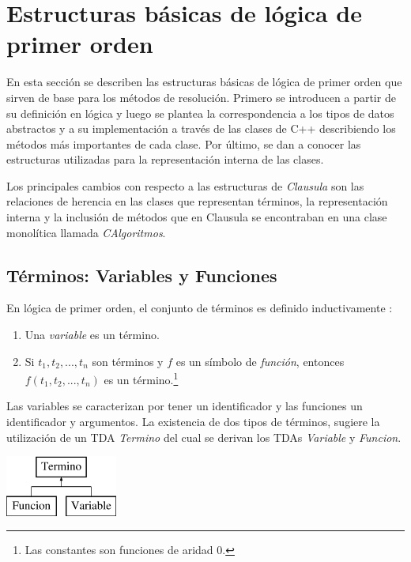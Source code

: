 \documentclass[a4paper,12pt]{article}
\begin{document}
\section{Estructuras básicas de lógica de primer orden}
En esta sección se describen las estructuras básicas de lógica de primer orden que sirven de base para los métodos de resolución.
Primero se introducen a partir de su definición en lógica y luego se plantea la correspondencia a los tipos de datos abstractos
y a su implementación a través de las clases de C++ describiendo los métodos más importantes de cada clase. 
Por último, se dan a conocer las estructuras utilizadas para la representación interna de las clases.

Los principales cambios con respecto a las estructuras de \emph{Clausula} son las relaciones de herencia
en las clases que representan términos, la representación interna y la inclusión de métodos que en Clausula
se encontraban en una clase monolítica llamada \emph{CAlgoritmos}.
\subsection{Términos: Variables y Funciones} %
En lógica de primer orden, el conjunto de términos es definido inductivamente \cite{ApuntesLogica}:
\begin{enumerate}
\item Una \emph{variable} es un término.
\item Si $t_1,t_2,...,t_n$ son términos y $f$ es un símbolo de \emph{función}, entonces $f(t_1,t_2,...,t_n)$
  es un término.\footnote{Las constantes son funciones de aridad 0.}
\end{enumerate}
Las variables se caracterizan por tener un identificador y las funciones un identificador y argumentos. La existencia de
dos tipos de términos, sugiere la utilización de un  TDA \emph{Termino} del cual se derivan los TDAs \emph{Variable} y 
\emph{Funcion}.
\begin{center}
\leavevmode
\includegraphics[height=2cm]{imagenes/classTermino}
\end{center}
\end{document}
